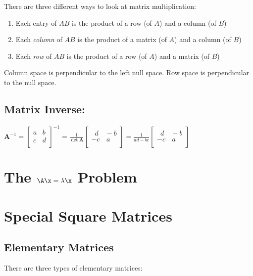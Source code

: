 {\begin{rmk}
	There are three different ways to look at matrix multiplication:
	\begin{enumerate}
		\item Each entry of $AB$ is the product of a row (of $A$) and a column (of $B$)
		\item Each {\em{column}} of $AB$ is the product of a matrix (of $A$) and a column (of $B$)
		\item Each {\em{row}} of $AB$ is the product of a row (of $A$) and a matrix (of $B$)
	\end{enumerate}
\end{rmk}

\begin{rmk}
	Column space is perpendicular to the left null space. Row space is perpendicular to the null space.
\end{rmk}

\section{Matrix Inverse: {\color{red}{Binomial inverse theorem, Schur Complement, Blockwise Inversion}}}
\begin{rmk}
	$\mathbf{A}^{-1} = \begin{bmatrix}
a & b \\ c & d \\ 
\end{bmatrix}^{-1} =
\frac{1}{\det{\mathbf{A}}} \begin{bmatrix}
\,\,\,d & \!\!-b \\ -c & \,a \\ 
\end{bmatrix} =
\frac{1}{ad - bc} \begin{bmatrix}
\,\,\,d & \!\!-b \\ -c & \,a \\ 
\end{bmatrix}$
\end{rmk}


\chapter{The $\A\x=\lambda \x$ Problem}

\chapter{Special Square Matrices}
\section{Elementary Matrices}
There are three types of elementary matrices: {\color{red}{Row Switching, Row Multiplication, and Row Addition.}}

}
